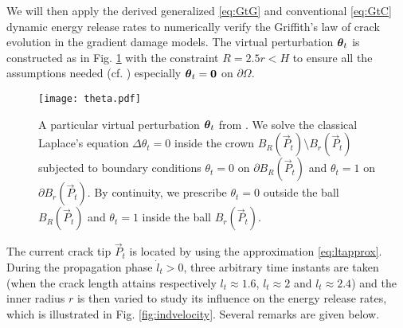 We will then apply the derived generalized \eqref{eq:GtG} and conventional \eqref{eq:GtC} dynamic energy release rates to numerically verify the Griffith's law of crack evolution in the gradient damage models. The virtual perturbation $\vtheta_t$ is constructed as in Fig. \ref{fig:theta} with the constraint $R=2.5r<H$ to ensure all the assumptions needed (cf. \cite{LiMarigo:2015}) especially $\vtheta_t=\vec{0}$ on $\partial\Omega$.
\begin{figure}[htbp]
\centering
\texttt{[image: theta.pdf]}
\caption{A particular virtual perturbation $\vtheta_t$ from \cite{LiMarigo:2015}.  We solve the classical Laplace's equation $\Delta\theta_t=0$ inside the crown $B_R(\vec{P}_t)\setminus B_r(\vec{P}_t)$ subjected to boundary conditions $\theta_t=0$ on $\partial B_R(\vec{P}_t)$ and $\theta_t=1$ on $\partial B_r(\vec{P}_t)$. By continuity, we prescribe $\theta_t=0$ outside the ball $B_R(\vec{P}_t)$ and $\theta_t=1$ inside the ball $B_r(\vec{P}_t)$.} \label{fig:theta}
\end{figure}
The current crack tip $\vec{P}_t$ is located by using the approximation \eqref{eq:ltapprox}. During the propagation phase $\dot{l}_t>0$, three arbitrary time instants are taken (when the crack length attains respectively $l_t\approx 1.6$, $l_t\approx 2$ and $l_t\approx 2.4$) and the inner radius $r$ is then varied to study its influence on the energy release rates, which is illustrated in Fig. \ref{fig:indvelocity}. Several remarks are given below.
